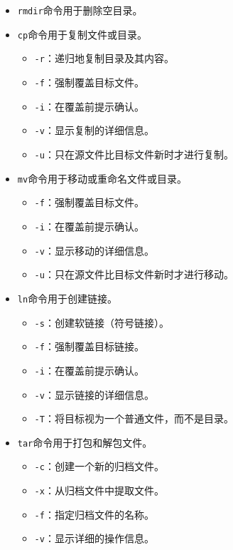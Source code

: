 \begin{itemize}
\begin{itemize}
\begin{itemize}
        \end{itemize}
      \item \texttt{rmdir}命令用于删除空目录。
      \item \texttt{cp}命令用于复制文件或目录。
        \begin{itemize}
          \item \texttt{-r}：递归地复制目录及其内容。
          \item \texttt{-f}：强制覆盖目标文件。
          \item \texttt{-i}：在覆盖前提示确认。
          \item \texttt{-v}：显示复制的详细信息。
          \item \texttt{-u}：只在源文件比目标文件新时才进行复制。
        \end{itemize}
      \item \texttt{mv}命令用于移动或重命名文件或目录。
        \begin{itemize}
          \item \texttt{-f}：强制覆盖目标文件。
          \item \texttt{-i}：在覆盖前提示确认。
          \item \texttt{-v}：显示移动的详细信息。
          \item \texttt{-u}：只在源文件比目标文件新时才进行移动。
        \end{itemize}
      \item \texttt{ln}命令用于创建链接。
        \begin{itemize}
          \item \texttt{-s}：创建软链接（符号链接）。
          \item \texttt{-f}：强制覆盖目标链接。
          \item \texttt{-i}：在覆盖前提示确认。
          \item \texttt{-v}：显示链接的详细信息。
          \item \texttt{-T}：将目标视为一个普通文件，而不是目录。
        \end{itemize}
      \item \texttt{tar}命令用于打包和解包文件。
        \begin{itemize}
          \item \texttt{-c}：创建一个新的归档文件。
          \item \texttt{-x}：从归档文件中提取文件。
          \item \texttt{-f}：指定归档文件的名称。
          \item \texttt{-v}：显示详细的操作信息。

\end{itemize}
\end{itemize}
\end{itemize}
